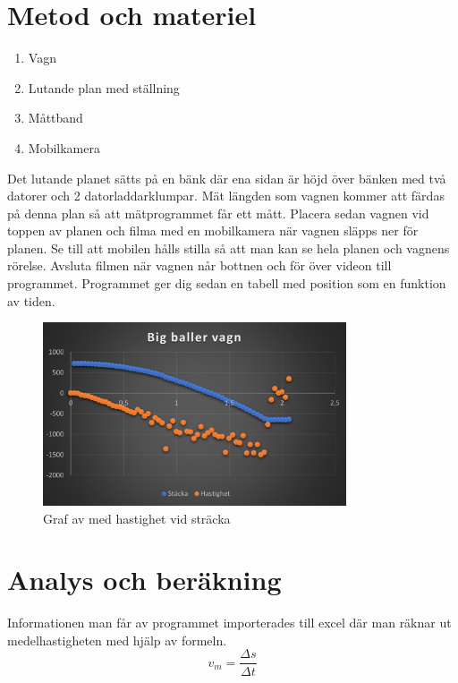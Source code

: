 \documentclass[11p, titlepage, oneside, a4paper]{article}
\begin{document}
\section{Metod och materiel}
        \begin{enumerate}
            \item Vagn
            \item Lutande plan med ställning
            \item Måttband
            \item Mobilkamera
        \end{enumerate}
        
        Det lutande planet sätts på en bänk där ena sidan är höjd över bänken med två datorer och 2 datorladdarklumpar. Mät längden som vagnen kommer att färdas på denna plan så att mätprogrammet får ett mått. Placera sedan vagnen vid toppen av planen och filma med en mobilkamera när vagnen släpps ner för planen. Se till att mobilen hålls stilla så att man kan se hela planen och vagnens rörelse. Avsluta filmen när vagnen når bottnen och för över videon till programmet. Programmet ger dig sedan en tabell med position som en funktion av tiden.
        \begin{figure}[!h]
            \includegraphics[width=0.8\textwidth]{images/Bild3.png}
            \caption{Graf av med hastighet vid sträcka}
            \label{fig:Bild3}
        \end{figure}
        
    \newpage
	\section{Analys och beräkning}


    Informationen man får av programmet importerades till excel där man räknar ut medelhastigheten med hjälp av formeln.
    \begin{equation}
        v_m = \frac{\Delta s}{\Delta t}
    \end{equation}
    
\end{document}
